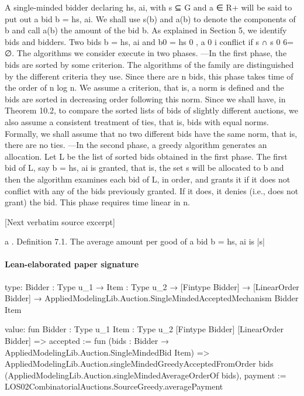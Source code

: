 \documentclass[10pt]{article}
\begin{document}
\begin{ReviewVerbatim}
A single-minded bidder declaring hs, ai, with s ⊆ G and a ∈ R+ will be said to
put out a bid b = hs, ai. We shall use s(b) and a(b) to denote the components of b
and call a(b) the amount of the bid b. As explained in Section 5, we identify bids
and bidders. Two bids b = hs, ai and b0 = hs 0 , a 0 i conflict if s ∩ s 0 6= ∅.
The algorithms we consider execute in two phases.
—In the first phase, the bids are sorted by some criterion. The algorithms of the
family are distinguished by the different criteria they use. Since there are n bids,
this phase takes time of the order of n log n. We assume a criterion, that is, a norm
is defined and the bids are sorted in decreasing order following this norm. Since
we shall have, in Theorem 10.2, to compare the sorted lists of bids of slightly
different auctions, we also assume a consistent treatment of ties, that is, bids
with equal norms. Formally, we shall assume that no two different bids have the
same norm, that is, there are no ties.
—In the second phase, a greedy algorithm generates an allocation. Let L be the
list of sorted bids obtained in the first phase. The first bid of L, say b = hs, ai is
granted, that is, the set s will be allocated to b and then the algorithm examines
each bid of L, in order, and grants it if it does not conflict with any of the bids
previously granted. If it does, it denies (i.e., does not grant) the bid. This phase
requires time linear in n.

[Next verbatim source excerpt]

a
.
Definition 7.1. The average amount per good of a bid b = hs, ai is |s|
\end{ReviewVerbatim}



\paragraph{Lean-elaborated paper signature}
\begin{ReviewVerbatim}
type:
{Bidder : Type u_1} →
  {Item : Type u_2} →
    [Fintype Bidder] → [LinearOrder Bidder] → AppliedModelingLib.Auction.SingleMindedAcceptedMechanism Bidder Item

value:
fun {Bidder : Type u_1} {Item : Type u_2} [Fintype Bidder] [LinearOrder Bidder] =>
  {
    accepted := fun (bids : Bidder → AppliedModelingLib.Auction.SingleMindedBid Item) =>
      AppliedModelingLib.Auction.singleMindedGreedyAcceptedFromOrder bids
        (AppliedModelingLib.Auction.singleMindedAverageOrderOf bids),
    payment := LOS02CombinatorialAuctions.SourceGreedy.averagePayment }
\end{ReviewVerbatim}
\end{document}
